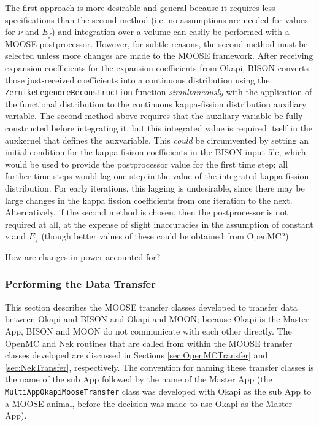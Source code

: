 \documentclass[10pt]{article}
\numberwithin{equation}{section} %
\begin{document}
The first approach is more desirable and general because it requires less specifications than the second method (i.e. no assumptions are needed for values for \(\nu\) and \(E_f\)) and integration over a volume can easily be performed with a MOOSE postprocessor. However, for subtle reasons, the second method must be selected unless more changes are made to the MOOSE framework. After receiving expansion coefficients for the expansion coefficients from Okapi, BISON converts those just-received coefficients into a continuous distribution using the {\tt ZernikeLegendreReconstruction} function {\it simultaneously} with the application of the functional distribution to the continuous kappa-fission distribution auxiliary variable. The second method above requires that the auxiliary variable be fully constructed before integrating it, but this integrated value is required itself in the auxkernel that defines the auxvariable. This {\it could} be circumvented by setting an initial condition for the kappa-fisison coefficients in the BISON input file, which would be used to provide the postprocessor value for the first time step; all further time steps would lag one step in the value of the integrated kappa fission distribution. For early iterations, this lagging is undesirable, since there may be large changes in the kappa fission coefficients from one iteration to the next. Alternatively, if the second method is chosen, then the postprocessor is not required at all, at the expense of slight inaccuracies in the assumption of constant \(\nu\) and \(E_f\) (though better values of these could be obtained from OpenMC?).

\color{magenta}
How are changes in power accounted for?
\color{black}

\subsubsection{Performing the Data Transfer}
This section describes the MOOSE transfer classes developed to transfer data between Okapi and BISON and Okapi and MOON; because Okapi is the Master App, BISON and MOON do not communicate with each other directly. The OpenMC and Nek routines that are called from within the MOOSE transfer classes developed are discussed in Sections \ref{sec:OpenMCTransfer} and \ref{sec:NekTransfer}, respectively. The convention for naming these transfer classes is the name of the sub App followed by the name of the Master App (the {\tt MultiAppOkapiMooseTransfer} class was developed with Okapi as the sub App to a MOOSE animal, before the decision was made to use Okapi as the Master App).
\end{document}
